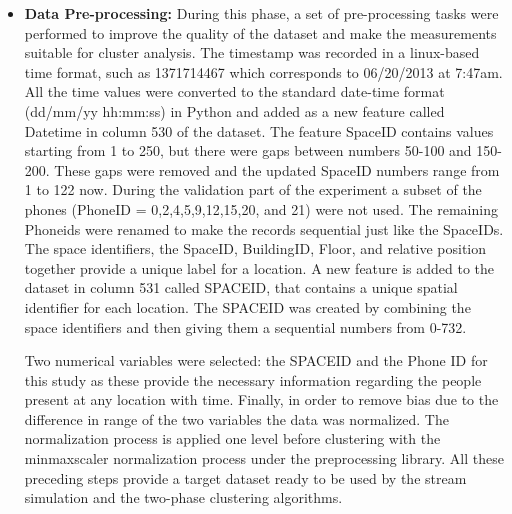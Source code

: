 \begin{itemize}



\item\textbf{Data Pre-processing:}
During this phase, a set of pre-processing tasks were performed to improve the quality of the dataset and make the measurements suitable for cluster analysis.
The timestamp was recorded in a linux-based time format, such as 1371714467 which corresponds to 06/20/2013 at 7:47am. All the time values were converted to the standard date-time format (dd/mm/yy hh:mm:ss) in Python and added as a new feature called Datetime in column 530 of the dataset.
The feature SpaceID contains values starting from 1 to 250, but there were gaps between numbers 50-100 and 150-200. These gaps were removed and the updated SpaceID numbers range from 1 to 122 now. During the validation part of the experiment a subset of the phones (PhoneID = 0,2,4,5,9,12,15,20, and 21) were not used. The remaining Phoneids were renamed to make the records sequential just like the SpaceIDs. The space identifiers, the SpaceID, BuildingID, Floor, and relative position together provide a unique label for a location. A new feature is added to the dataset in column 531 called SPACEID, that contains a unique spatial identifier for each location. The SPACEID was created by combining the space identifiers and then giving them a sequential numbers from 0-732.

Two numerical variables were selected: the SPACEID and the Phone ID for this study as these provide the necessary information regarding the people present at any location with time. Finally, in order to remove bias due to the difference in range of the two variables the data was normalized. The normalization process is applied one level before clustering with the minmaxscaler normalization process under the preprocessing library. All these preceding steps provide a target dataset ready to be used by the stream simulation and the two-phase clustering algorithms. 





\end{itemize}
